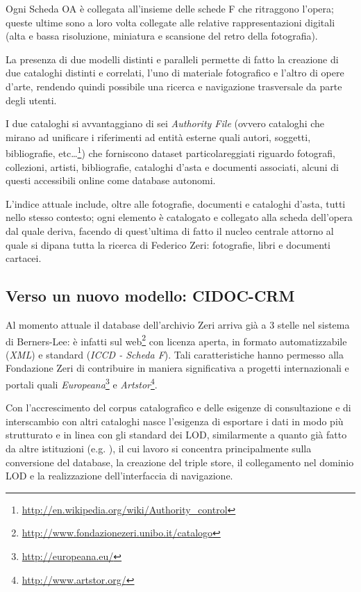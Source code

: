 Ogni Scheda OA è collegata all'insieme delle schede F che ritraggono l'opera; queste ultime sono a loro volta collegate alle relative rappresentazioni digitali (alta e bassa risoluzione, miniatura e scansione del retro della fotografia).

La presenza di due modelli distinti e paralleli permette di fatto la creazione di due cataloghi distinti e correlati, l'uno di materiale fotografico e l'altro di opere d'arte, rendendo quindi possibile una ricerca e navigazione trasversale da parte degli utenti.

I due cataloghi si avvantaggiano di sei \emph{Authority File} (ovvero cataloghi che mirano ad unificare i riferimenti ad entità esterne quali autori, soggetti, bibliografie, etc\ldots\footnote{\url{http://en.wikipedia.org/wiki/Authority_control}}) che forniscono dataset particolareggiati riguardo fotografi, collezioni, artisti, bibliografie, cataloghi d'asta e documenti associati, alcuni di questi accessibili online come database autonomi.

L'indice attuale include, oltre alle fotografie, documenti e cataloghi d'asta, tutti nello stesso contesto; ogni elemento è catalogato e collegato alla scheda dell'opera dal quale deriva, facendo di quest'ultima di fatto il nucleo centrale attorno al quale si dipana tutta la ricerca di Federico Zeri: fotografie, libri e documenti cartacei.

\subsection{Verso un nuovo modello: CIDOC-CRM}\label{sec:towards-a-new-model}
Al momento attuale il database dell'archivio Zeri arriva già a 3 stelle nel sistema di Berners-Lee: è infatti sul web\footnote{\url{http://www.fondazionezeri.unibo.it/catalogo}} con licenza aperta, in formato automatizzabile (\emph{XML}) e standard (\emph{ICCD - Scheda F}). Tali caratteristiche hanno permesso alla Fondazione Zeri di contribuire in maniera significativa a progetti internazionali e portali quali \emph{Europeana}\footnote{\url{http://europeana.eu/}} e \emph{Artstor}\footnote{\url{http://www.artstor.org/}}.

Con l'accrescimento del corpus catalografico e delle esigenze di consultazione e di interscambio con altri cataloghi nasce l'esigenza di esportare i dati in modo più strutturato e in linea con gli standard dei LOD, similarmente a quanto già fatto da altre istituzioni (e.g. \cite{5,9,10,11,12}), il cui lavoro si concentra principalmente sulla conversione del database, la creazione del triple store, il collegamento nel dominio LOD e la realizzazione dell'interfaccia di navigazione.

